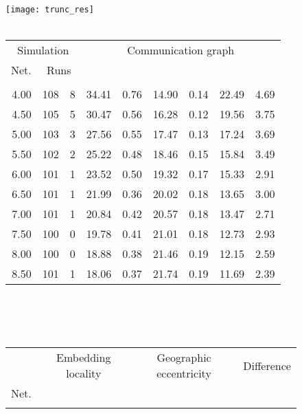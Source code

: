 \documentclass{article}
\begin{document}
\begin{figure}[h]
\begin{center}
\texttt{[image: trunc\_res]}
~\\~\\
\begin{tabular}{|r|rr|rr|rr|rr|}
\hline
\multicolumn{3}{|c|}{Simulation} & \multicolumn{6}{|c|}{Communication graph}\\
\multicolumn{1}{|c}{Net.} & \multicolumn{2}{c|}{Runs} & \multicolumn{2}{|c}{} & \multicolumn{2}{c}{} & \multicolumn{2}{c|}{}\\
\hline
\multicolumn{1}{|c|}{} & \multicolumn{1}{|c}{} & \multicolumn{1}{c|}{} & \multicolumn{1}{|c}{} & \multicolumn{1}{c|}{} & \multicolumn{1}{|c}{} & \multicolumn{1}{c|}{} & \multicolumn{1}{|c}{} & \multicolumn{1}{c|}{}\\
4.00 & 108 & 8 & 34.41 & 0.76 & 14.90 & 0.14 & 22.49 & 4.69\\
4.50 & 105 & 5 & 30.47 & 0.56 & 16.28 & 0.12 & 19.56 & 3.75\\
5.00 & 103 & 3 & 27.56 & 0.55 & 17.47 & 0.13 & 17.24 & 3.69\\
5.50 & 102 & 2 & 25.22 & 0.48 & 18.46 & 0.15 & 15.84 & 3.49\\
6.00 & 101 & 1 & 23.52 & 0.50 & 19.32 & 0.17 & 15.33 & 2.91\\
6.50 & 101 & 1 & 21.99 & 0.36 & 20.02 & 0.18 & 13.65 & 3.00\\
7.00 & 101 & 1 & 20.84 & 0.42 & 20.57 & 0.18 & 13.47 & 2.71\\
7.50 & 100 & 0 & 19.78 & 0.41 & 21.01 & 0.18 & 12.73 & 2.93\\
8.00 & 100 & 0 & 18.88 & 0.38 & 21.46 & 0.19 & 12.15 & 2.59\\
8.50 & 101 & 1 & 18.06 & 0.37 & 21.74 & 0.19 & 11.69 & 2.39\\
\hline
\end{tabular}\\
~\\~\\
\begin{tabular}{|r|rr|rr|rr|rr|rr|}
\hline
& \multicolumn{4}{|c|}{Embedding locality} & \multicolumn{4}{|c|}{Geographic eccentricity} & \multicolumn{2}{|c|}{Difference}\\
Net. & \multicolumn{2}{c}{} & \multicolumn{2}{c|}{} & \multicolumn{2}{c}{} & \multicolumn{2}{c|}{}&  & \\
\hline
\multicolumn{1}{|c|}{} & \multicolumn{1}{|c}{} & \multicolumn{1}{c|}{} & \multicolumn{1}{|c}{} & \multicolumn{1}{c|}{} & \multicolumn{1}{|c}{} & \multicolumn{1}{c|}{} & \multicolumn{1}{|c}{} & \multicolumn{1}{c|}{} & \multicolumn{1}{|c}{} & \multicolumn{1}{c|}{}\\

\end{tabular}
\end{center}
\end{figure}
\end{document}
